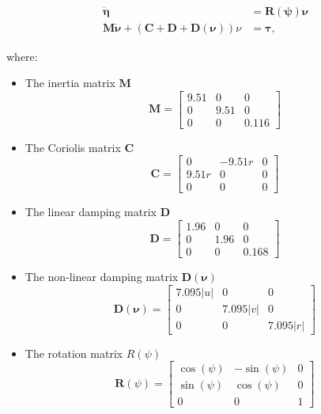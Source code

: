 \begin{align*}
    \mathbf{\dot{\eta}} &= \mathbf{R(\psi)}\mathbf{\nu} \\
    \mathbf{M}\mathbf{\dot{\nu}} + (\mathbf{C} + \mathbf{D} + \mathbf{D}(\mathbf{\nu}))\nu &= \mathbf{\tau},
\end{align*}

where:

\begin{itemize}
    \item The inertia matrix $\mathbf{M}$
    \begin{equation}
    \mathbf{M} = \begin{bmatrix}9.51 & 0 & 0 \\ 0 & 9.51 & 0 \\ 0 & 0 & 0.116 \end{bmatrix}
    \end{equation}
    \item The Coriolis matrix $\mathbf{C}$
        \begin{equation}
    \mathbf{C} = \begin{bmatrix}0 & -9.51r & 0 \\  9.51r & 0 & 0  \\ 0 & 0 & 0 \end{bmatrix}
    \end{equation}
    \item The linear damping matrix $\mathbf{D}$
   \begin{equation}
    \mathbf{D} =  \begin{bmatrix}1.96 & 0 & 0 \\ 0 & 1.96 & 0 \\ 0 & 0 & 0.168 \end{bmatrix}
    \end{equation}
    \item The non-linear damping matrix $\mathbf{D(\nu)}$
    \begin{equation}
    \mathbf{D(\boldsymbol{\nu})} =  \begin{bmatrix}7.095|u| & 0 & 0 \\ 0 & 7.095|v| & 0 \\ 0 & 0 & 7.095|r| \end{bmatrix}
    \end{equation}
    \item The rotation matrix $R(\psi)$ 
    \begin{equation}
        \mathbf{R}(\psi) = \begin{bmatrix}\cos({\psi}) & -\sin{(\psi)} & 0 \\
        \sin{(\psi)} & \cos{(\psi)} & 0 \\ 0 & 0 & 1\end{bmatrix}
    \end{equation}
\end{itemize}

